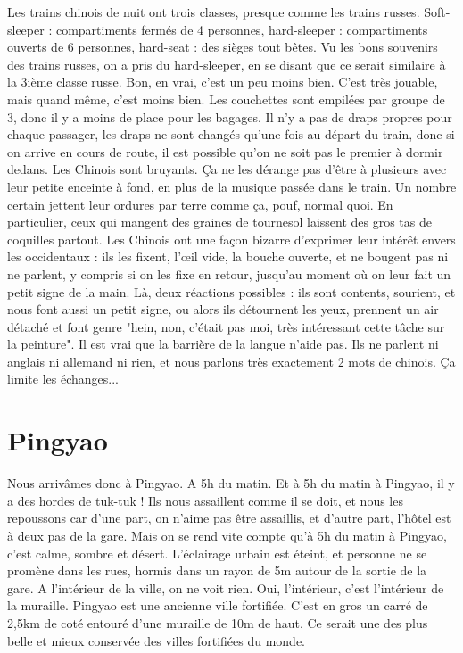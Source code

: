 \documentclass{book}
\begin{document}
Les trains chinois de nuit ont trois classes, presque comme les trains russes. Soft-sleeper : compartiments fermés de 4 personnes, hard-sleeper : compartiments ouverts de 6 personnes, hard-seat : des sièges tout bêtes. Vu les bons souvenirs des trains russes, on a pris du hard-sleeper, en se disant que ce serait similaire à la 3ième classe russe. Bon, en vrai, c'est un peu moins bien. C'est très jouable, mais quand même, c'est moins bien. Les couchettes sont empilées par groupe de 3, donc il y a moins de place pour les bagages. Il n'y a pas de draps propres pour chaque passager, les draps ne sont changés qu'une fois au départ du train, donc si on arrive en cours de route, il est possible qu'on ne soit pas le premier à dormir dedans. Les Chinois sont bruyants. Ça ne les dérange pas d'être à plusieurs avec leur petite enceinte à fond, en plus de la musique passée dans le train. Un nombre certain jettent leur ordures par terre comme ça, pouf, normal quoi. En particulier, ceux qui mangent des graines de tournesol laissent des gros tas de coquilles partout. Les Chinois ont une façon bizarre d'exprimer leur intérêt envers les occidentaux : ils les fixent, l’œil vide, la bouche ouverte, et ne bougent pas ni ne parlent, y compris si on les fixe en retour, jusqu'au moment où on leur fait un petit signe de la main. Là, deux réactions possibles : ils sont contents, sourient, et nous font aussi un petit signe, ou alors ils détournent les yeux, prennent un air détaché et font genre "hein, non, c'était pas moi, très intéressant cette tâche sur la peinture". Il est vrai que la barrière de la langue n'aide pas. Ils ne parlent ni anglais ni allemand ni rien, et nous parlons très exactement 2 mots de chinois. Ça limite les échanges...



\chapter{Pingyao}
Nous arrivâmes donc à Pingyao. A 5h du matin. Et à 5h du matin à Pingyao, il y a des hordes de tuk-tuk ! Ils nous assaillent comme il se doit, et nous les repoussons car d'une part, on n'aime pas être assaillis, et d'autre part, l'hôtel est à deux pas de la gare. Mais on se rend vite compte qu'à 5h du matin à Pingyao, c'est calme, sombre et désert. L'éclairage urbain est éteint, et personne ne se promène dans les rues, hormis dans un rayon de 5m autour de la sortie de la gare. A l'intérieur de la ville, on ne voit rien. Oui, l'intérieur, c'est l'intérieur de la muraille. Pingyao est une ancienne ville fortifiée. C'est en gros un carré de 2,5km de coté entouré d'une muraille de 10m de haut. Ce serait une des plus belle et mieux conservée des villes fortifiées du monde.
\end{document}
